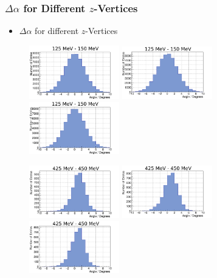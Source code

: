 \documentclass[slidestop,compress,mathserif]{beamer}
\begin{document}
\begin{frame}
	\frametitle{$\Delta \alpha$ for Different $z$-Vertices}
	\begin{itemize}
		\item $\Delta \alpha$ for different $z$-Vertices
	\end{itemize}

\begin{figure}
	\includegraphics[width=0.35\textwidth]{Pictures/20170205DiffOeffZVertex-4_125MeV}
	\includegraphics[width=0.35\textwidth]{Pictures/20170205DiffOeffZVertexUrsprung135MeV}	
	\includegraphics[width=0.35\textwidth]{Pictures/20170205DiffOeffZVertex+4_125MeV}	

	\includegraphics[width=0.35\textwidth]{Pictures/20170205DiffOeffZVertex-4_425MeV}
	\includegraphics[width=0.35\textwidth]{Pictures/20170205DiffOeffZVertexUrsprung425MeV}
	\includegraphics[width=0.35\textwidth]{Pictures/20170205DiffOeffZVertex+4_425MeV}	
	
\end{figure}
	
\end{frame}
\end{document}
